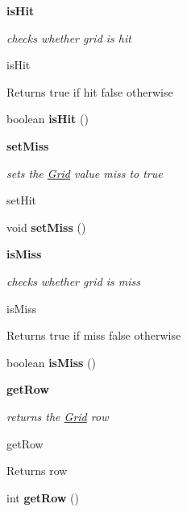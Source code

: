 \begin{Indent}{\bf is\+Hit}\par
{\em checks whether grid is hit

is\+Hit

\begin{DoxyReturn}{Returns}
true if hit false otherwise 
\end{DoxyReturn}
}\begin{DoxyCompactItemize}
\item 
\hypertarget{classbattleship_1_1gameboard_1_1Grid_ae5512d2b307323567a2adddf95161b12}{}boolean {\bfseries is\+Hit} ()\label{classbattleship_1_1gameboard_1_1Grid_ae5512d2b307323567a2adddf95161b12}

\end{DoxyCompactItemize}
\end{Indent}
\begin{Indent}{\bf set\+Miss}\par
{\em sets the \hyperlink{classbattleship_1_1gameboard_1_1Grid}{Grid} value miss to true

set\+Hit }\begin{DoxyCompactItemize}
\item 
\hypertarget{classbattleship_1_1gameboard_1_1Grid_a87e1b27214796a4bbd649ce31ee03484}{}void {\bfseries set\+Miss} ()\label{classbattleship_1_1gameboard_1_1Grid_a87e1b27214796a4bbd649ce31ee03484}

\end{DoxyCompactItemize}
\end{Indent}
\begin{Indent}{\bf is\+Miss}\par
{\em checks whether grid is miss

is\+Miss

\begin{DoxyReturn}{Returns}
true if miss false otherwise 
\end{DoxyReturn}
}\begin{DoxyCompactItemize}
\item 
\hypertarget{classbattleship_1_1gameboard_1_1Grid_ad80d35cbcf62c4c87d8d0de09ceabeb0}{}boolean {\bfseries is\+Miss} ()\label{classbattleship_1_1gameboard_1_1Grid_ad80d35cbcf62c4c87d8d0de09ceabeb0}

\end{DoxyCompactItemize}
\end{Indent}
\begin{Indent}{\bf get\+Row}\par
{\em returns the \hyperlink{classbattleship_1_1gameboard_1_1Grid}{Grid} row

get\+Row

\begin{DoxyReturn}{Returns}
row 
\end{DoxyReturn}
}\begin{DoxyCompactItemize}
\item 
\hypertarget{classbattleship_1_1gameboard_1_1Grid_a7639f77451994ff9293dc6b03e1e404c}{}int {\bfseries get\+Row} ()\label{classbattleship_1_1gameboard_1_1Grid_a7639f77451994ff9293dc6b03e1e404c}

\end{DoxyCompactItemize}
\end{Indent}
